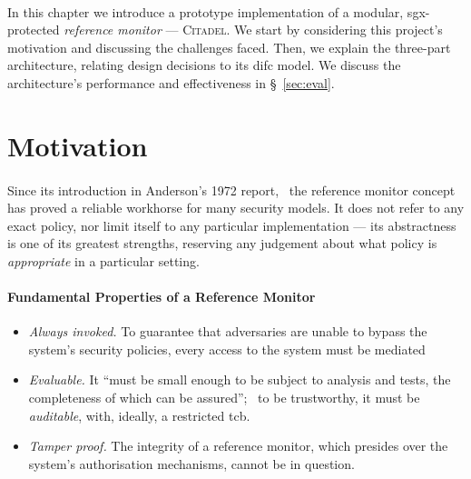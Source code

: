 

\paragraph{} In this chapter we introduce a prototype implementation of a modular, \acrshort{sgx}-protected \textit{reference monitor} --- \textsc{Citadel}. We start by considering this project's motivation and discussing the challenges faced. Then, we explain the three-part architecture, relating design decisions to its \acrshort{difc} model. We discuss the architecture's performance and effectiveness in §~\ref{sec:eval}.

\section{Motivation}
\paragraph{} Since its introduction in Anderson's 1972 report,~\cite{reference-monitor} the reference monitor concept has proved a reliable workhorse for many security models. It does not refer to any exact policy, nor limit itself to any particular implementation --- its abstractness is one of its greatest strengths, reserving any judgement about what policy is \textit{appropriate} in a particular setting.~\cite{irvine-rm}

\paragraph{Fundamental Properties of a Reference Monitor}

\begin{itemize}
    \item \textit{Always invoked.} To guarantee that adversaries are unable to bypass the system's security policies, every access to the system must be mediated
    \item \textit{Evaluable.} It ``must be small enough to be subject to analysis and tests, the completeness of which can be assured'';~\cite{reference-monitor} to be trustworthy, it must be \textit{auditable}, with, ideally, a restricted \acrshort{tcb}.
    \item \textit{Tamper proof.} The integrity of a reference monitor, which presides over the system's authorisation mechanisms, cannot be in question.
\end{itemize}

